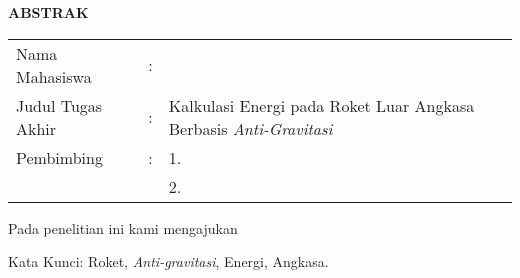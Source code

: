 \begin{center}
  \large\textbf{ABSTRAK}
\end{center}


\vspace{2ex}

\begingroup
  \setlength{\tabcolsep}{0pt}

  \noindent
  \begin{tabularx}{\textwidth}{l >{\centering}m{2em} X}
    Nama Mahasiswa    &:& \name{} \\

    Judul Tugas Akhir &:&	Kalkulasi Energi pada Roket Luar Angkasa Berbasis \emph{Anti-Gravitasi} \\

    Pembimbing        &:& 1. \advisor{} \\
                      & & 2. \coadvisor{} \\
  \end{tabularx}
\endgroup

Pada penelitian ini kami mengajukan \lipsum[1]

Kata Kunci: Roket, \emph{Anti-gravitasi}, Energi, Angkasa.

